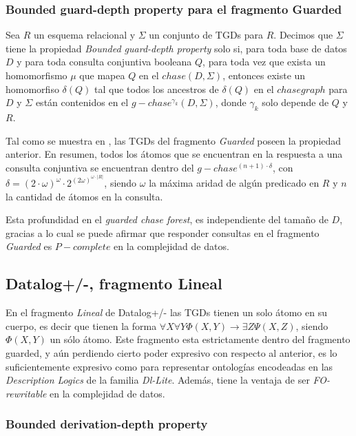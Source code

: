 \documentclass[11pt,a4paper,twoside]{tesis}
\begin{document}
\subsubsection{Bounded guard-depth property para el fragmento Guarded}

Sea $R$ un esquema relacional y $\Sigma$ un conjunto de TGDs para $R$. Decimos que $\Sigma$ tiene la propiedad \textit{Bounded guard-depth property} solo si, para toda base de datos $D$ y para toda consulta conjuntiva booleana $Q$, para toda vez que exista un homomorfismo $\mu$ que mapea $Q$ en el $chase(D, \Sigma)$, entonces existe un homomorfiso $\delta(Q)$ tal que todos los ancestros de $\delta(Q)$ en el $chase graph$ para $D$ y $\Sigma$ están contenidos en el $g-chase^{\gamma_k}(D, \Sigma)$, donde $\gamma_k$ solo depende de $Q$ y $R$.

Tal como se muestra en \cite{JWS}, las TGDs del fragmento \textit{Guarded} poseen la propiedad anterior. En resumen, todos los átomos que se encuentran en la respuesta a una consulta conjuntiva se encuentran dentro del $g-chase^{(n + 1)\cdot\delta}$, con $\delta = (2\cdot\omega)^\omega\cdot2^{(2\omega)^{\omega\cdot|R|}}$, siendo $\omega$ la máxima aridad de algún predicado en $R$ y $n$ la cantidad de átomos en la consulta.

Esta profundidad en el \textit{guarded chase forest}, es independiente del tamaño de $D$, gracias a lo cual se puede afirmar que responder consultas en el fragmento \textit{Guarded} es $P-complete$ en la complejidad de datos.

\subsection{Datalog+/-, fragmento Lineal}

En el fragmento \textit{Lineal} de Datalog+/- las TGDs tienen un solo átomo en su cuerpo, es decir que tienen la forma $\forall X \forall  Y \Phi(X, Y) \rightarrow \exists Z \Psi(X,Z)$, siendo $\Phi(X,Y)$ un sólo átomo. Este fragmento esta estrictamente dentro del fragmento guarded, y aún perdiendo cierto poder expresivo con respecto al anterior, es lo suficientemente expresivo como para representar ontologías encodeadas en las \textit{Description Logics} de la familia \textit{Dl-Lite}. Además, tiene la ventaja de ser \textit{FO-rewritable} en la complejidad de datos.

\subsubsection{Bounded derivation-depth property}
\end{document}
